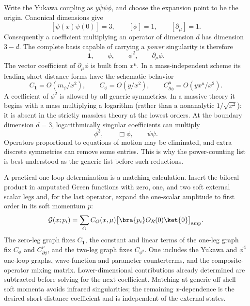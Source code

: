 \ExerciseEditorialNote

\begin{enumerate}
  Write the Yukawa coupling as \(y\bar\psi\psi\phi\), and choose the
  expansion point to be the origin.  Canonical dimensions give
  \[
    [\bar\psi(x)\psi(0)]=3,\qquad
    [\phi]=1,\qquad [\partial_\mu]=1.
  \]
  Consequently a coefficient multiplying an operator of dimension \(d\)
  has dimension \(3-d\).  The complete basis capable of carrying a
  \emph{power} singularity is therefore
  \[
    \boxed{\mathbf{1},\qquad \phi,\qquad \phi^2,\qquad
      \partial_\mu\phi.}
  \]
  The vector coefficient of \(\partial_\mu\phi\) is built from \(x^\mu\).
  In a mass-independent scheme its leading short-distance forms have the
  schematic behavior
  \[
    C_{\mathbf{1}}=O(m_\psi/x^2),\qquad
    C_\phi=O(y/x^2),\qquad
    C_{\partial\phi}^{\mu}=O(yx^\mu/x^2).
  \]
  A coefficient of \(\phi^2\) is allowed by all generic symmetries.  In a
  massive theory it begins with a mass multiplying a logarithm (rather
  than a nonanalytic \(1/\sqrt{x^2}\)); it is absent in the strictly
  massless theory at the lowest orders.  At the boundary dimension
  \(d=3\), logarithmically singular coefficients can multiply
  \[
    \phi^3,\qquad \Box\phi,\qquad \bar\psi\psi.
  \]
  Operators proportional to equations of motion may be eliminated, and
  extra discrete symmetries can remove some entries.  This is why the
  power-counting list is best understood as the generic list before such
  reductions.

  A practical one-loop determination is a matching calculation.  Insert
  the bilocal product in amputated Green functions with zero, one, and two
  soft external scalar legs and, for the last operator, expand the
  one-scalar amplitude to first order in its soft momentum \(p\):
  \[
    \mathcal G(x;p_i)
      =\sum_O C_O(x,\mu)
        \bigl[\bra{p_i}O_R(0)\ket{0}\bigr]_{\rm amp}.
  \]
  The zero-leg graph fixes \(C_{\mathbf{1}}\), the constant and linear terms
  of the one-leg graph fix \(C_\phi\) and
  \(C_{\partial\phi}^{\mu}\), and the two-leg graph fixes
  \(C_{\phi^2}\).  One includes the Yukawa and \(\phi^4\) one-loop graphs,
  wave-function and parameter counterterms, and the composite-operator
  mixing matrix.  Lower-dimensional contributions already determined are
  subtracted before solving for the next coefficient.  Matching at
  generic off-shell soft momenta avoids infrared singularities; the
  remaining \(x\)-dependence is the desired short-distance coefficient
  and is independent of the external states.


\end{enumerate}

